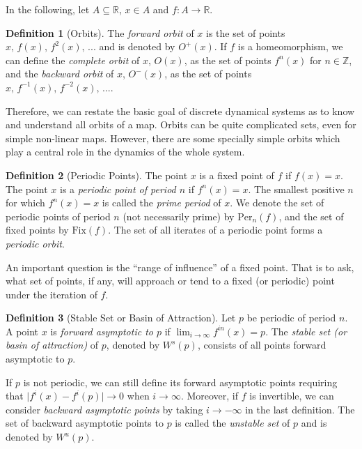 \documentclass[10pt,twoside,titlepage]{book}
\numberwithin{equation}{chapter}
\numberwithin{figure}{chapter}
\numberwithin{table}{chapter}
\theoremstyle{plain}%
\theoremstyle{definition}
\newtheorem{defn}{Definition}[chapter]
\theoremstyle{remark}
\begin{document}
In the following, let $A\subseteq\mathbb{R}$, $x\in A$ and $f:A\rightarrow\mathbb{R}$.

\begin{defn}[Orbits]
	The \emph{forward orbit} of $x$ is the set of points $x,\, f(x),\, f^{2}(x),\,...$ and is denoted by $O^{+}(x)$. If $f$ is a homeomorphism, we can define the \emph{complete orbit} of $x$, $O(x)$, as the set of points $f^{n}(x)$ for $n\in\mathbb{Z}$, and the \emph{backward orbit} of $x$, $O^{-}(x)$, as the set of points $x,\, f^{-1}(x),\, f^{-2}(x),\,...$.
\end{defn}

Therefore, we can restate the basic goal of discrete dynamical systems as to know and understand all orbits of a map. Orbits can be quite complicated sets, even for simple non-linear maps. However, there are some specially simple orbits which play a central role in the dynamics of the whole system.

\begin{defn}[Periodic Points]
	The point $x$ is a fixed point of $f$ if $f(x)=x$. The point $x$ is a \emph{periodic point of period $n$} if $f^{n}(x)=x$. The smallest positive $n$ for which $f^{n}(x)=x$ is called the \emph{prime period} of $x$. We denote the set of periodic points of period $n$ (not necessarily prime) by $\mathrm{Per}_{n}(f)$, and the set of fixed points by $\mathrm{Fix}(f)$. The set of all iterates of a periodic point forms a \emph{periodic orbit}.
\end{defn}

An important question is the ``range of influence'' of a fixed point. That is to ask, what set of points, if any, will approach or tend to a fixed (or periodic) point under the iteration of $f$.

\begin{defn}[Stable Set or Basin of Attraction]
	Let $p$ be periodic of period $n$. A point $x$ is \emph{forward asymptotic to $p$} if $\lim_{i\rightarrow\infty}f^{in}(x)=p$. The \emph{stable set (or basin of attraction)} of $p$, denoted by $W^{s}(p)$, consists of all points forward asymptotic to $p$.
\end{defn}

If $p$ is not periodic, we can still define its forward asymptotic points requiring that $\vert f^{i}(x)-f^{i}(p)\vert\rightarrow0$ when $i\rightarrow\infty$. Moreover, if $f$ is invertible, we can consider \emph{backward asymptotic points} by taking $i\rightarrow-\infty$ in the last definition. The set of backward asymptotic points to $p$ is called the \emph{unstable set} of $p$ and is denoted by $W^{u}(p)$.
\end{document}
